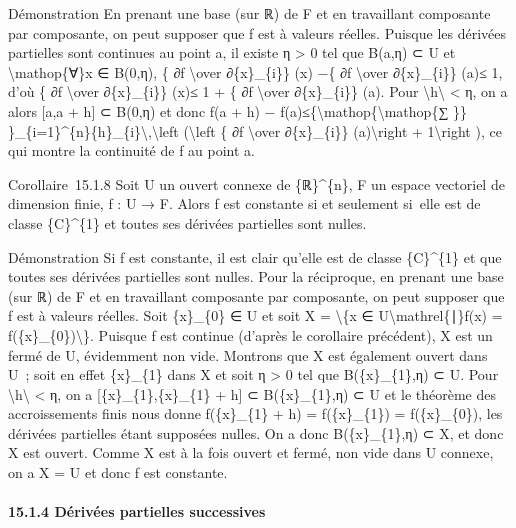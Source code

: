 \documentclass[]{article}
\begin{document}
Démonstration En prenant une base (sur ℝ) de F et en travaillant
composante par composante, on peut supposer que f est à valeurs réelles.
Puisque les dérivées partielles sont continues au point a, il existe η
\textgreater{} 0 tel que B(a,η) ⊂ U et \textbackslash{}mathop\{∀\}x ∈
B(0,η), \textbar{}\{ ∂f \textbackslash{}over ∂\{x\}\_\{i\}\} (x) −\{ ∂f
\textbackslash{}over ∂\{x\}\_\{i\}\} (a)\textbar{}≤ 1, d'où \textbar{}\{
∂f \textbackslash{}over ∂\{x\}\_\{i\}\} (x)\textbar{}≤ 1 + \textbar{}\{
∂f \textbackslash{}over ∂\{x\}\_\{i\}\} (a)\textbar{}. Pour
\textbackslash{}\textbar{}h\textbackslash{}\textbar{} \textless{} η, on
a alors {[}a,a + h{]} ⊂ B(0,η) et donc \textbar{}f(a + h) −
f(a)\textbar{}≤\{\textbackslash{}mathop\{\textbackslash{}mathop\{∑ \}\}
\}\_\{i=1\}\^{}\{n\}\textbar{}\{h\}\_\{i\}\textbar{}\textbackslash{},\textbackslash{}left
(\textbackslash{}left \textbar{}\{ ∂f \textbackslash{}over
∂\{x\}\_\{i\}\} (a)\textbackslash{}right \textbar{} +
1\textbackslash{}right ), ce qui montre la continuité de f au point a.

Corollaire~15.1.8 Soit U un ouvert connexe de \{ℝ\}\^{}\{n\}, F un
espace vectoriel de dimension finie, f : U → F. Alors f est constante si
et seulement si~elle est de classe \{C\}\^{}\{1\} et toutes ses dérivées
partielles sont nulles.

Démonstration Si f est constante, il est clair qu'elle est de classe
\{C\}\^{}\{1\} et que toutes ses dérivées partielles sont nulles. Pour
la réciproque, en prenant une base (sur ℝ) de F et en travaillant
composante par composante, on peut supposer que f est à valeurs réelles.
Soit \{x\}\_\{0\} ∈ U et soit X = \textbackslash{}\{x ∈
U\textbackslash{}mathrel\{∣\}f(x) = f(\{x\}\_\{0\})\textbackslash{}\}.
Puisque f est continue (d'après le corollaire précédent), X est un fermé
de U, évidemment non vide. Montrons que X est également ouvert dans U~;
soit en effet \{x\}\_\{1\} dans X et soit η \textgreater{} 0 tel que
B(\{x\}\_\{1\},η) ⊂ U. Pour
\textbackslash{}\textbar{}h\textbackslash{}\textbar{} \textless{} η, on
a {[}\{x\}\_\{1\},\{x\}\_\{1\} + h{]} ⊂ B(\{x\}\_\{1\},η) ⊂ U et le
théorème des accroissements finis nous donne f(\{x\}\_\{1\} + h) =
f(\{x\}\_\{1\}) = f(\{x\}\_\{0\}), les dérivées partielles étant
supposées nulles. On a donc B(\{x\}\_\{1\},η) ⊂ X, et donc X est ouvert.
Comme X est à la fois ouvert et fermé, non vide dans U connexe, on a X =
U et donc f est constante.

\paragraph{15.1.4 Dérivées partielles successives}
\end{document}
